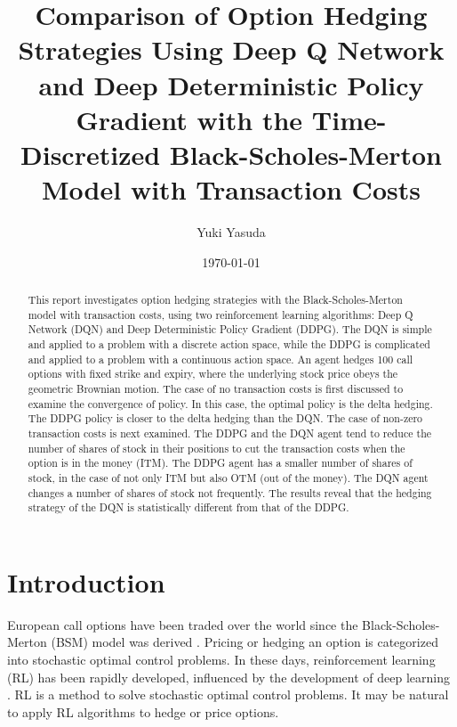 \documentclass[11pt]{article}
\begin{document}

\title{Comparison of Option Hedging Strategies Using Deep Q Network and Deep Deterministic Policy Gradient with the Time-Discretized Black-Scholes-Merton Model with Transaction Costs}

\author{Yuki Yasuda}

\date{\today}

\maketitle

\begin{abstract}
   This report investigates option hedging strategies with the Black-Scholes-Merton model with transaction costs, using two reinforcement learning algorithms: Deep Q Network (DQN) and Deep Deterministic Policy Gradient (DDPG). The DQN is simple and applied to a problem with a discrete action space, while the DDPG is complicated and applied to a problem with a continuous action space. An agent hedges 100 call options with fixed strike and expiry, where the underlying stock price obeys the geometric Brownian motion. The case of no transaction costs is first discussed to examine the convergence of policy. In this case, the optimal policy is the delta hedging. The DDPG policy is closer to the delta hedging than the DQN. The case of non-zero transaction costs is next examined. The DDPG and the DQN agent tend to reduce the number of shares of stock in their positions to cut the transaction costs when the option is in the money (ITM). The DDPG agent has a smaller number of shares of stock, in the case of not only ITM but also OTM (out of the money). The DQN agent changes a number of shares of stock not frequently. The results reveal that the hedging strategy of the DQN is statistically different from that of the DDPG.   
\end{abstract}


\section{Introduction}

European call options have been traded over the world since the Black-Scholes-Merton (BSM) model was derived \citep{Shreve:2008}. Pricing or hedging an option is categorized into stochastic optimal control problems. In these days, reinforcement learning (RL) \citep{Sutton:Barto:2018} has been rapidly developed, influenced by the development of deep learning \citep{Goodfellow:etal:2018}. RL is a method to solve stochastic optimal control problems. It may be natural to apply RL algorithms to hedge or price options.
\end{document}
